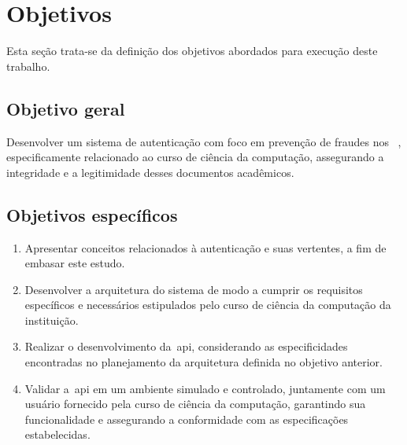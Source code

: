 \section{Objetivos}\label{sec:objetivos}

Esta seção trata-se da definição dos objetivos abordados para
execução deste trabalho.
\subsection{Objetivo geral}\label{subsec:objetivo-geral}

Desenvolver um sistema de autenticação com foco em prevenção de fraudes nos
~, especificamente relacionado ao curso de ciência da computação,
assegurando a integridade e a legitimidade desses documentos acadêmicos.
\subsection{Objetivos específicos}\label{subsec:objetivos-especificos}

\newcommand{\buscaReferencia}{
    Apresentar conceitos relacionados à autenticação e suas vertentes, a fim de
    embasar este estudo.
}

\newcommand{\arquitetura}{
    Desenvolver a arquitetura do sistema de modo a cumprir os requisitos
    específicos e necessários estipulados pelo curso de ciência da computação da instituição.
}

\newcommand{\implementacao}{
    Realizar o desenvolvimento da~\acrshort{api}, considerando as especificidades
    encontradas no planejamento da arquitetura definida no objetivo anterior.
}

\newcommand{\testes}{
    Validar a~\acrshort{api} em um ambiente simulado e controlado, juntamente com um usuário fornecido
    pela curso de ciência da computação, garantindo sua funcionalidade e
    assegurando a conformidade com as especificações estabelecidas.
}

\begin{enumerate}[label=\alph*)]
    \item  \buscaReferencia
    \item  \arquitetura
    \item  \implementacao
    \item  \testes
\end{enumerate}